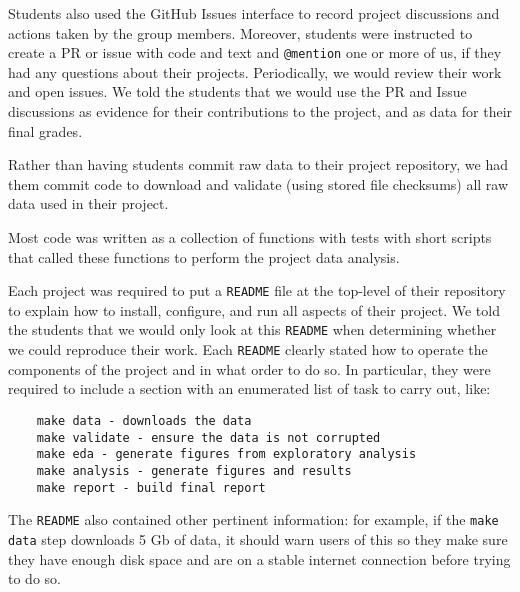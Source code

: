 Students also used the GitHub Issues interface to record project discussions
and actions taken by the group members.
Moreover, students were instructed to create a PR
or issue with code and text and \texttt{@mention} one or more of us,
if they had any questions about their projects.
Periodically, we would review their work and open issues.
We told the students that we would use the PR and Issue discussions
as evidence for their contributions to the project, and as data for their
final grades.

Rather than having students commit raw data to their project repository, we had
them commit code to download and validate (using stored file checksums)
all raw data used in their project.

Most code was written as a collection of functions with tests with short
scripts that called these functions to perform the project data analysis.


Each project was required to put a \texttt{README} file at the top-level
of their repository to explain how to install, configure,
and run all aspects of their project.
We told the students that we would only look at this \texttt{README}
when determining whether we could reproduce their work.
Each \texttt{README} clearly stated  how to operate the
components of the project and in what order to do so.
In particular, they were required to include a section with
an enumerated list of task to carry out, like:
\begin{verbatim}
    make data - downloads the data 
    make validate - ensure the data is not corrupted
    make eda - generate figures from exploratory analysis
    make analysis - generate figures and results
    make report - build final report
\end{verbatim}

The \texttt{README} also contained other pertinent information:
for example, if the \texttt{make data} step downloads 5 Gb of data, it should
warn users of this so they make sure they have enough disk space and are on a
stable internet connection before trying to do so.

